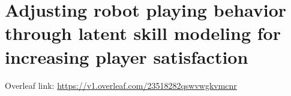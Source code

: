 \chapter{Adjusting robot playing behavior through latent skill modeling for increasing player satisfaction}\label{ch:adaptation}

Overleaf link: \url{https://v1.overleaf.com/23518282qswvwgkvmcnr}

